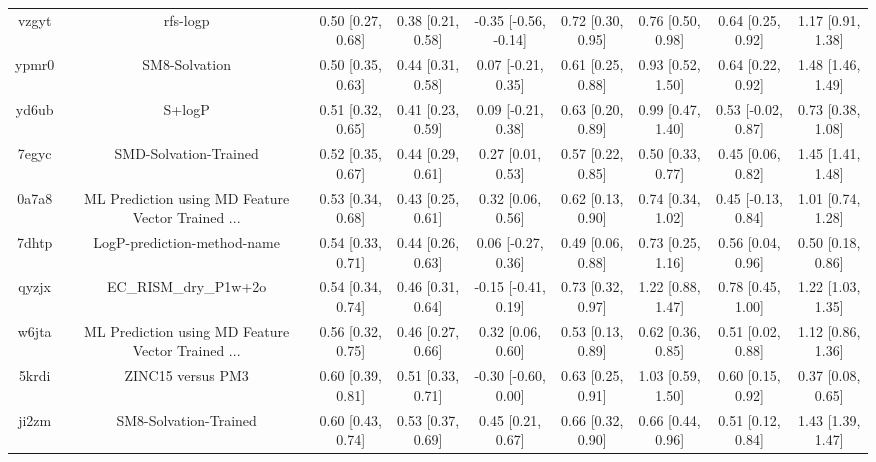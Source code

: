 \documentclass{article}
\begin{document}
\begin{center}
\begin{longtable}{|ccccccccc|}
 vzgyt &                                           rfs-logp &  0.50 [0.27, 0.68] &  0.38 [0.21, 0.58] &  -0.35 [-0.56, -0.14] &  0.72 [0.30, 0.95] &    0.76 [0.50, 0.98] &    0.64 [0.25, 0.92] &     1.17 [0.91, 1.38] \\
 ypmr0 &                                      SM8-Solvation &  0.50 [0.35, 0.63] &  0.44 [0.31, 0.58] &    0.07 [-0.21, 0.35] &  0.61 [0.25, 0.88] &    0.93 [0.52, 1.50] &    0.64 [0.22, 0.92] &     1.48 [1.46, 1.49] \\
 yd6ub &                                             S+logP &  0.51 [0.32, 0.65] &  0.41 [0.23, 0.59] &    0.09 [-0.21, 0.38] &  0.63 [0.20, 0.89] &    0.99 [0.47, 1.40] &   0.53 [-0.02, 0.87] &     0.73 [0.38, 1.08] \\
 7egyc &                              SMD-Solvation-Trained &  0.52 [0.35, 0.67] &  0.44 [0.29, 0.61] &     0.27 [0.01, 0.53] &  0.57 [0.22, 0.85] &    0.50 [0.33, 0.77] &    0.45 [0.06, 0.82] &     1.45 [1.41, 1.48] \\
 0a7a8 &  ML Prediction using MD Feature Vector Trained ... &  0.53 [0.34, 0.68] &  0.43 [0.25, 0.61] &     0.32 [0.06, 0.56] &  0.62 [0.13, 0.90] &    0.74 [0.34, 1.02] &   0.45 [-0.13, 0.84] &     1.01 [0.74, 1.28] \\
 7dhtp &                        LogP-prediction-method-name &  0.54 [0.33, 0.71] &  0.44 [0.26, 0.63] &    0.06 [-0.27, 0.36] &  0.49 [0.06, 0.88] &    0.73 [0.25, 1.16] &    0.56 [0.04, 0.96] &     0.50 [0.18, 0.86] \\
 qyzjx &                              EC\_RISM\_dry\_P1w+2o &  0.54 [0.34, 0.74] &  0.46 [0.31, 0.64] &   -0.15 [-0.41, 0.19] &  0.73 [0.32, 0.97] &    1.22 [0.88, 1.47] &    0.78 [0.45, 1.00] &     1.22 [1.03, 1.35] \\
 w6jta &  ML Prediction using MD Feature Vector Trained ... &  0.56 [0.32, 0.75] &  0.46 [0.27, 0.66] &     0.32 [0.06, 0.60] &  0.53 [0.13, 0.89] &    0.62 [0.36, 0.85] &    0.51 [0.02, 0.88] &     1.12 [0.86, 1.36] \\
 5krdi &                                  ZINC15 versus PM3 &  0.60 [0.39, 0.81] &  0.51 [0.33, 0.71] &   -0.30 [-0.60, 0.00] &  0.63 [0.25, 0.91] &    1.03 [0.59, 1.50] &    0.60 [0.15, 0.92] &     0.37 [0.08, 0.65] \\
 ji2zm &                              SM8-Solvation-Trained &  0.60 [0.43, 0.74] &  0.53 [0.37, 0.69] &     0.45 [0.21, 0.67] &  0.66 [0.32, 0.90] &    0.66 [0.44, 0.96] &    0.51 [0.12, 0.84] &     1.43 [1.39, 1.47] \\

\end{longtable}
\end{center}
\end{document}
